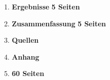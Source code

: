 \begin{framed}
\begin{enumerate}[label=\arabic*.]
    \item   \textbf{Ergebnisse}                                         \dotfill \textbf{5 Seiten}
    
    \item   \textbf{Zusammenfassung}                                    \dotfill \textbf{5 Seiten}
    
    \item[] \textbf{Quellen}
    
    \item[] \textbf{Anhang}
    
    \item[]                                                             \hfill \textbf{60 Seiten}
\end{enumerate}
\end{framed}